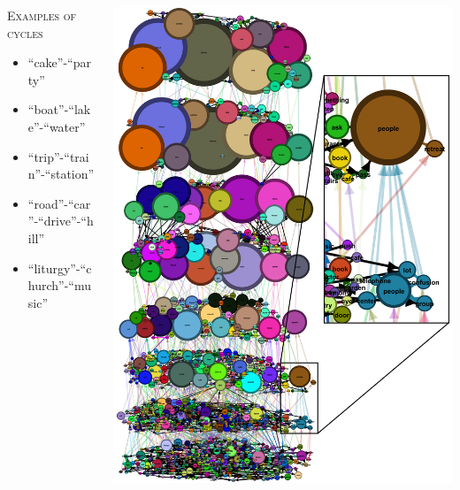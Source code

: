 \begin{minipage}[t]{\textwidth}
    \vspace{-0.4cm}
    \begin{columns}
    \begin{column}{0.33\textwidth}
        {\color{orangeUnicam} \scshape \small Examples of cycles}
        {\tiny
        \begin{itemize}
            \item “cake”-“party”
            \item “boat”-“lake”-“water”
            \item “trip”-“train”-“station”
            \item “road”-“car”-“drive”-“hill”
            \item “liturgy”-“church”-“music”
        \end{itemize}}
        \vspace{1.74cm}
    \end{column}
    \hfill
    \begin{column}{0.66\textwidth}
        \includegraphics[height=0.85\textheight]{immagini/grafo_ml_focus}
    \end{column}
    \end{columns}
\end{minipage}